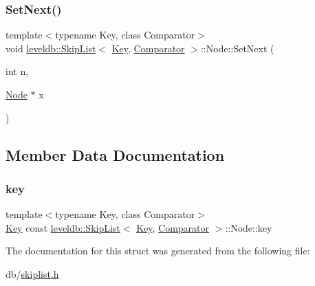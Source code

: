 \subsubsection{\texorpdfstring{SetNext()}{SetNext()}}
{\footnotesize\ttfamily template$<$typename Key, class Comparator$>$ \\
void \mbox{\hyperlink{classleveldb_1_1_skip_list}{leveldb\+::\+Skip\+List}}$<$ \mbox{\hyperlink{namespaceleveldb_a7e9a9725b13fa0bd922d885280dfab95}{Key}}, \mbox{\hyperlink{structleveldb_1_1_comparator}{Comparator}} $>$\+::Node\+::\+Set\+Next (\begin{DoxyParamCaption}\item[{int}]{n,  }\item[{\mbox{\hyperlink{structleveldb_1_1_skip_list_1_1_node}{Node}} $\ast$}]{x }\end{DoxyParamCaption})\hspace{0.3cm}{\ttfamily [inline]}}



\subsection{Member Data Documentation}
\mbox{\label{structleveldb_1_1_skip_list_1_1_node_a654f196e057edd294e4dbcbb6dabb844}} 
\subsubsection{\texorpdfstring{key}{key}}
{\footnotesize\ttfamily template$<$typename Key, class Comparator$>$ \\
\mbox{\hyperlink{namespaceleveldb_a7e9a9725b13fa0bd922d885280dfab95}{Key}} const \mbox{\hyperlink{classleveldb_1_1_skip_list}{leveldb\+::\+Skip\+List}}$<$ \mbox{\hyperlink{namespaceleveldb_a7e9a9725b13fa0bd922d885280dfab95}{Key}}, \mbox{\hyperlink{structleveldb_1_1_comparator}{Comparator}} $>$\+::Node\+::key}



The documentation for this struct was generated from the following file\+:\begin{DoxyCompactItemize}
\item 
db/\mbox{\hyperlink{skiplist_8h}{skiplist.\+h}}\end{DoxyCompactItemize}
